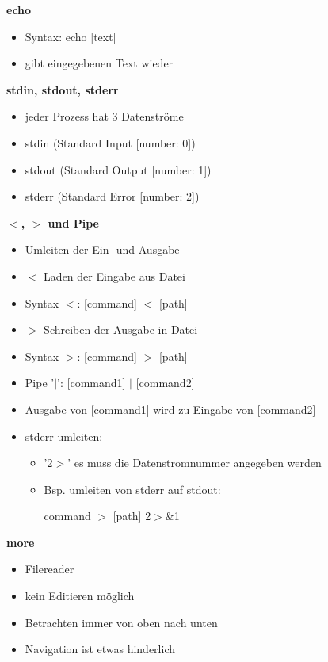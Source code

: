 \documentclass{article}
\begin{document}
\textbf{echo}
\begin{itemize}
	\item Syntax: echo [text]
	\item gibt eingegebenen Text wieder
\end{itemize}

\textbf{stdin, stdout, stderr}
\begin{itemize}
	\item jeder Prozess hat 3 Datenströme
	\item stdin (Standard Input [number: 0])
	\item stdout (Standard Output [number: 1])
	\item stderr (Standard Error [number: 2])
\end{itemize}

\textbf{$<$, $>$ und Pipe}
\begin{itemize}
	\item Umleiten der Ein- und Ausgabe
	\item $<$ Laden der Eingabe aus Datei
	\item Syntax $<$: [command] $<$ [path]
	\item $>$ Schreiben der Ausgabe in Datei
	\item Syntax $>$: [command] $>$ [path]
	\item Pipe '$\mid$': [command1] $\mid$ [command2]
	\item Ausgabe von [command1] wird zu Eingabe von [command2]
	\item stderr umleiten:
	\begin{itemize}
		\item '2$>$' es muss die Datenstromnummer angegeben werden
		\item Bsp. umleiten von stderr auf stdout:
		\item [command] $>$ [path] 2$>\&$1
	\end{itemize}	 
\end{itemize}

\textbf{more}
\begin{itemize}
	\item Filereader
	\item kein Editieren möglich
	\item Betrachten immer von oben nach unten
	\item Navigation ist etwas hinderlich
\end{itemize}
\end{document}
